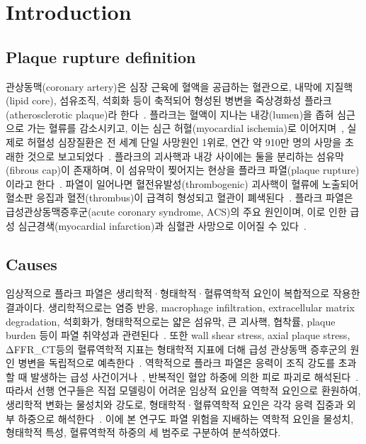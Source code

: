 \documentclass[master,english,final]{kaist-ucs}
\begin{document}
\addtocounter{pagemarker}{1}
\newpage

\tableofcontents
\listoftables
\listoffigures


\chapter{Introduction}

\section{Plaque rupture definition}
관상동맥(coronary artery)은 심장 근육에 혈액을 공급하는 혈관으로, 내막에 지질핵(lipid core), 섬유조직, 석회화 등이 축적되어 형성된 병변을 죽상경화성 플라크(atherosclerotic plaque)라 한다~\cite{bentzon2014, otsuka2016}. 플라크는 혈액이 지나는 내강(lumen)을 좁혀 심근으로 가는 혈류를 감소시키고, 이는 심근 허혈(myocardial ischemia)로 이어지며~\cite{bentzon2014}, 실제로 허혈성 심장질환은 전 세계 단일 사망원인 1위로, 연간 약 910만 명의 사망을 초래한 것으로 보고되었다~\cite{WHO2024Top10}.
플라크의 괴사핵과 내강 사이에는 둘을 분리하는 섬유막(fibrous cap)이 존재하며, 이 섬유막이 찢어지는 현상을 플라크 파열(plaque rupture)이라고 한다~\cite{virmani2000, otsuka2016}. 파열이 일어나면 혈전유발성(thrombogenic) 괴사핵이 혈류에 노출되어 혈소판 응집과 혈전(thrombus)이 급격히 형성되고 혈관이 폐색된다~\cite{otsuka2016}. 플라크 파열은 급성관상동맥증후군(acute coronary syndrome, ACS)의 주요 원인이며, 이로 인한 급성 심근경색(myocardial infarction)과 심혈관 사망으로 이어질 수 있다~\cite{lee2019, otsuka2016}.

\section{Causes}
임상적으로 플라크 파열은 생리학적·형태학적·혈류역학적 요인이 복합적으로 작용한 결과이다. 생리학적으로는 염증 반응, macrophage infiltration, extracellular matrix degradation, 석회화가, 형태학적으로는 얇은 섬유막, 큰 괴사핵, 협착률, plaque burden 등이 파열 취약성과 관련된다~\cite{bentzon2014, virmani2006}. 또한 wall shear stress, axial plaque stress, ΔFFR_CT등의 혈류역학적 지표는 형태학적 지표에 더해 급성 관상동맥 증후군의 원인 병변을 독립적으로 예측한다~\cite{lee2019emerald, yang2021hemodynamics}.
역학적으로 플라크 파열은 응력이 조직 강도를 초과할 때 발생하는 급성 사건이거나~\cite{choi2015aps, brown2016, gu2022}, 반복적인 혈압 하중에 의한 피로 파괴로 해석된다~\cite{bank2000, versluis2006}. 따라서 선행 연구들은 직접 모델링이 어려운 임상적 요인을 역학적 요인으로 환원하여, 생리학적 변화는 물성치와 강도로, 형태학적·혈류역학적 요인은 각각 응력 집중과 외부 하중으로 해석한다~\cite{brown2016, gu2022, corti2022}. 이에 본 연구도 파열 위험을 지배하는 역학적 요인을 물성치, 형태학적 특성, 혈류역학적 하중의 세 범주로 구분하여 분석하였다.
\end{document}
